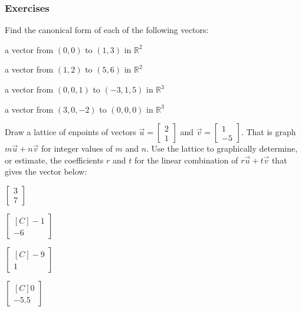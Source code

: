 \subsubsection{Exercises}

\begin{exercise} Find the canonical form of each of the following vectors:\\
\begin{inparaenum}[a)]
\item a vector from $(0,0)$ to $(1,3)$ in $\mathbb{R}^2$\\
\item a vector from $(1,2)$ to $(5,6)$ in $\mathbb{R}^2$\\
\item a vector from $(0,0,1)$ to $(-3,1,5)$ in $\mathbb{R}^3$\\
\item a vector from $(3,0,-2)$ to $(0,0,0)$ in $\mathbb{R}^3$\\
\end{inparaenum}
\end{exercise}

\begin{exercise} Draw a lattice of enpoints of vectors $\vec{u}=\begin{bmatrix}2\\1\end{bmatrix}$ and $\vec{v}=\begin{bmatrix}1\\-5\end{bmatrix}$. That is graph 
$m\vec{u}+n\vec{v}$ for integer values of $m$ and $n$. Use the lattice to graphically determine, or estimate, the coefficients $r$ and $t$ for the linear combination of $r\vec{u}+t\vec{v}$ that gives the vector below:\\
\begin{inparaenum}
\item $\begin{bmatrix}3 \\ 7 \end{bmatrix}$\hfill 
\item $\begin{bmatrix*}[C]-1 \\ -6 \end{bmatrix*}$\hfill {} \\
\item $\begin{bmatrix*}[C]-9 \\ 1 \end{bmatrix*}$\hfill 
\item $\begin{bmatrix*}[C] 0 \\ -5.5 \end{bmatrix*}$\hfill {} \\
\end{inparaenum}
\end{exercise}

